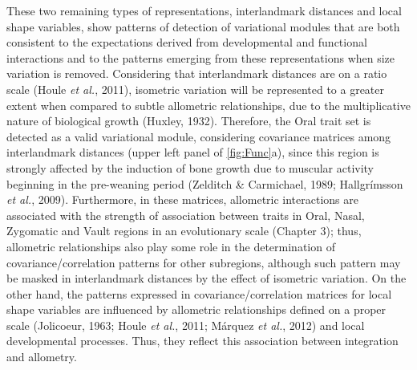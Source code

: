 \documentclass[12pt,twoside]{report}
\begin{document}
These two remaining types of representations, interlandmark distances
and local shape variables, show patterns of detection of variational
modules that are both consistent to the expectations derived from
developmental and functional interactions and to the patterns emerging
from these representations when size variation is removed. Considering
that interlandmark distances are on a ratio scale (Houle \emph{et al.},
2011), isometric variation will be represented to a greater extent when
compared to subtle allometric relationships, due to the multiplicative
nature of biological growth (Huxley, 1932). Therefore, the Oral trait
set is detected as a valid variational module, considering covariance
matrices among interlandmark distances (upper left panel of
\autoref{fig:Func}a), since this region is strongly affected by the
induction of bone growth due to muscular activity beginning in the
pre-weaning period (Zelditch \& Carmichael, 1989; Hallgrímsson \emph{et
al.}, 2009). Furthermore, in these matrices, allometric interactions are
associated with the strength of association between traits in Oral,
Nasal, Zygomatic and Vault regions in an evolutionary scale (Chapter 3);
thus, allometric relationships also play some role in the determination
of covariance/correlation patterns for other subregions, although such
pattern may be masked in interlandmark distances by the effect of
isometric variation. On the other hand, the patterns expressed in
covariance/correlation matrices for local shape variables are influenced
by allometric relationships defined on a proper scale (Jolicoeur, 1963;
Houle \emph{et al.}, 2011; Márquez \emph{et al.}, 2012) and local
developmental processes. Thus, they reflect this association between
integration and allometry.
\end{document}

